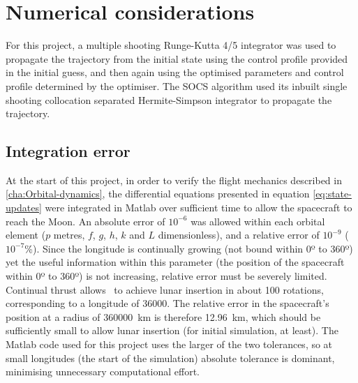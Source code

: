 
\section{Numerical considerations} \label{sec:Numerical-considerations}


For this project, a multiple shooting Runge-Kutta 4/5 integrator was used to propagate the trajectory from the initial state using the control profile provided in the initial guess, and then again using the optimised parameters and control profile determined by the optimiser. The SOCS algorithm used its inbuilt single shooting collocation separated Hermite-Simpson integrator \parencite{Betts2010} to propagate the trajectory.


\subsection{Integration error} \label{sub:Integration-error}

At the start of this project, in order to verify the flight mechanics described in \autoref{cha:Orbital-dynamics}, the differential equations presented in equation \eqref{eq:state-updates} were integrated in Matlab over sufficient time to allow the spacecraft to reach the Moon. An absolute error of $10^{-6}$ was allowed within each orbital element ($p$ metres, $f$, $g$, $h$, $k$ and $L$ dimensionless), and a relative error of $10^{-9}$ ($10^{-7}$\%). Since the longitude is continually growing (not bound within 0º to 360º) yet the useful information within this parameter (the position of the spacecraft within 0º to 360º) is not increasing, relative error must be severely limited. Continual thrust allows \BW\ to achieve lunar insertion in about 100 rotations, corresponding to a longitude of 36000\degrees. The relative error in the spacecraft's position at a radius of 360000~km is therefore 12.96~km, which should be sufficiently small to allow lunar insertion (for initial simulation, at least). The Matlab code used for this project uses the larger of the two tolerances, so at small longitudes (the start of the simulation) absolute tolerance is dominant, minimising unnecessary computational effort.


